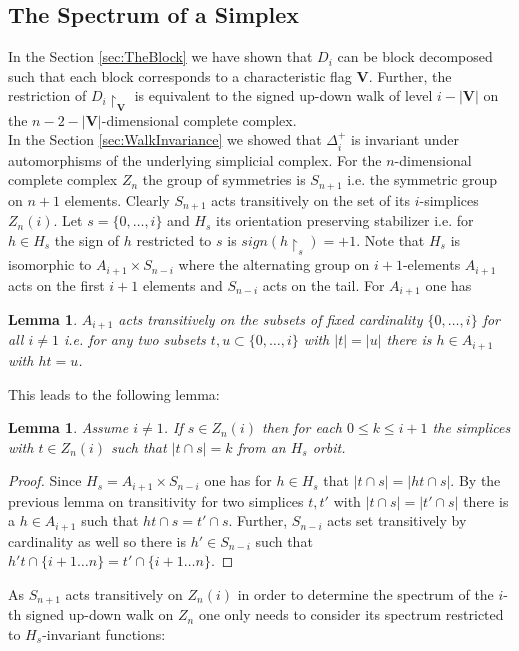 \documentclass[11pt]{amsart}
\newtheorem{lemma}[theorem]{Lemma}
\begin{document}
    \subsection{The Spectrum of a Simplex}
    \label{sec:SimplexSpecs}
    In the Section \ref{sec:TheBlock} we have shown that $D_i$ can be block decomposed such that each block corresponds to a characteristic flag $\mathbf{V}$. Further, the restriction of $D_i\restriction_{\mathbf{V}}$ is equivalent to the signed up-down walk of level $i-|\mathbf{V}|$ on the $n-2-|\mathbf{V}|$-dimensional complete complex. \\
    In the Section \ref{sec:WalkInvariance} we showed that $\Delta_i^+$ is invariant under automorphisms of the underlying simplicial complex. For the $n$-dimensional complete complex $Z_n$ the group of symmetries is $S_{n+1}$ i.e. the symmetric group on $n+1$ elements. Clearly $S_{n+1}$ acts transitively on the set of its $i$-simplices $Z_n(i)$. Let $s=\{0,\dots, i\}$ and $H_s$ its orientation preserving stabilizer i.e. for $h\in H_s$ the sign of $h$ restricted to $s$ is $sign(h\restriction_s)=+1$. Note that $H_s$ is isomorphic to $A_{i+1}\times S_{n-i}$ where the alternating group on $i+1$-elements $A_{i+1}$ acts on the first $i+1$ elements and $S_{n-i}$ acts on the tail. For $A_{i+1}$ one has
    \begin{lemma}
        $A_{i+1}$ acts  transitively on the subsets of fixed cardinality $\{0,\dots, i\}$ for all $i\neq 1$ i.e. for any two subsets $t,u\subset \{0,\dots, i\}$ with $|t|=|u|$ there is $h\in A_{i+1}$ with $ht=u$.
    \end{lemma}
    This leads to the following lemma:
    \begin{lemma}
        Assume $i\neq 1$. If $s\in Z_n(i)$ then for each $0\leq k\leq i+1$ the simplices with $t\in Z_n(i)$ such that $|t\cap s|=k$ from an $H_s$ orbit. 
    \end{lemma}
    \begin{proof}
        Since $H_s=A_{i+1}\times S_{n-i}$ one has for $h\in H_s$ that $|t\cap s|=|ht\cap s|$. By the previous lemma on transitivity for two simplices $t,t'$ with $|t\cap s|=|t'\cap s|$ there is  a $h\in A_{i+1}$ such that $ht\cap s=t'\cap s$. Further, $S_{n-i}$ acts set transitively by cardinality as well so there is $h'\in S_{n-i}$ such that $h't\cap\{i+1\dots n\}=t'\cap\{i+1\dots n\}$.
    \end{proof}
    As $S_{n+1}$ acts transitively on $Z_n(i)$ in order to determine the spectrum of the $i$-th signed up-down walk on $Z_n$ one only needs to consider its spectrum restricted to $H_s$-invariant functions:
\end{document}
